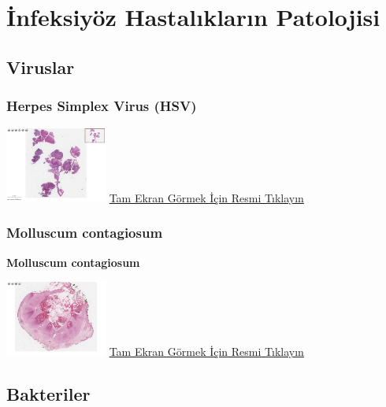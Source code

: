 \documentclass[
  letterpaper,
  DIV=11,
  numbers=noendperiod]{scrreprt}
\begin{document}
\part{İnfeksiyöz Hastalıkların Patolojisi}

\hypertarget{sec-viruslar}{%
\chapter{Viruslar}\label{sec-viruslar}}

\hypertarget{sec-herpes-simplex-virus}{%
\section{Herpes Simplex Virus (HSV)}\label{sec-herpes-simplex-virus}}

\href{https://images.patolojiatlasi.com/HSV/herpesesophagitis/viewer_z0.html}{\includegraphics[width=0.25\textwidth,height=\textheight]{./screenshots/thumbnail_herpesesophagitis.png}}
\href{https://images.patolojiatlasi.com/HSV/herpesesophagitis/viewer_z0.html}{Tam
Ekran Görmek İçin Resmi Tıklayın}

\hypertarget{sec-molluscum-contagiosum}{%
\section{Molluscum contagiosum}\label{sec-molluscum-contagiosum}}

\textbf{Molluscum contagiosum}

\href{https://images.patolojiatlasi.com/molluscum-contagiosum/HE.html}{\includegraphics[width=0.25\textwidth,height=\textheight]{./screenshots/thumbnail_molluscum-contagiosum.png}}
\href{https://images.patolojiatlasi.com/molluscum-contagiosum/HE.html}{Tam
Ekran Görmek İçin Resmi Tıklayın}

\hypertarget{sec-bakteriler}{%
\chapter{Bakteriler}\label{sec-bakteriler}}
\end{document}
